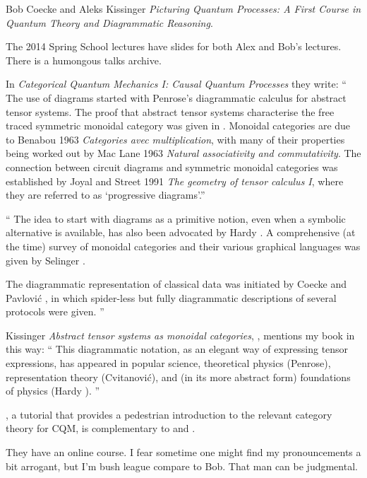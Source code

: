 \begin{description}
 {Bob Coecke} and
 {Aleks Kissinger}
{\em Picturing Quantum Processes: A First Course in Quantum Theory and
Diagrammatic Reasoning}.

The 2014 Spring School 
{lectures} have slides for both Alex and Bob's lectures. There is a humongous
 {talks archive}.

In {\em Categorical Quantum Mechanics I: Causal Quantum Processes}
they write: ``
The use of diagrams started with Penrose's diagrammatic calculus for abstract
tensor  systems.  The  proof  that  abstract  tensor  systems
characterise  the free traced symmetric monoidal category was given in
. Monoidal categories are due to Benabou 1963 {\em Categories
avec multiplication}, with many of their properties being worked out by Mac
Lane 1963 {\em Natural associativity and commutativity}.  The connection
between circuit diagrams and symmetric monoidal categories was established by
Joyal and Street 1991 {\em The geometry of tensor calculus I}, where they are
referred to as `progressive diagrams'.''

``
The idea to start with diagrams as a primitive notion, even when a symbolic
alternative is available, has also been advocated by Hardy . A
comprehensive (at the time) survey of monoidal categories and their various
graphical languages was given by Selinger .

The diagrammatic representation of classical data was initiated by Coecke and
Pavlovi\'c , in which spider-less but fully diagrammatic
descriptions of several protocols were given.
''

Kissinger
{\em Abstract tensor systems as monoidal categories},
, mentions my book in this way: ``
This diagrammatic notation, as an elegant way of expressing tensor expressions,
has appeared in popular science, theoretical physics (Penrose), representation
theory (Cvitanovi{\'c}), and (in its more abstract form) foundations of
physics (Hardy ).
''

, a tutorial that provides a pedestrian introduction to the
relevant category theory for CQM, is complementary to  and
.

They have an  {online
course}. I fear sometime one might find
 {my
pronouncements} a bit arrogant, but I'm bush league compare to Bob. That man
can be judgmental.


\end{description}

